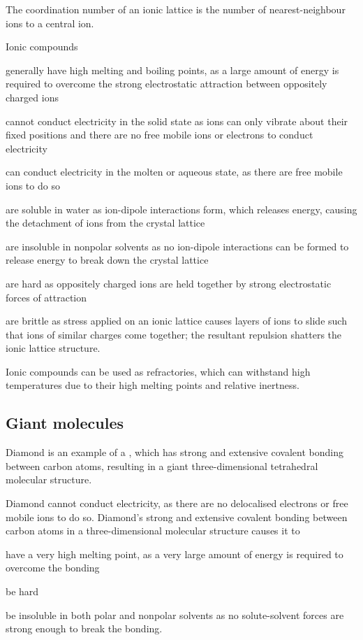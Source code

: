 \documentclass[Chemistry.tex]{subfiles}
\begin{document}
The coordination number of an ionic lattice is the number of nearest-neighbour ions to a central ion.

Ionic compounds \begin{slinenum}
\item generally have high melting and boiling points, as a large amount of energy is required to overcome the strong electrostatic attraction between oppositely charged ions
\item cannot conduct electricity in the solid state as ions can only vibrate about their fixed positions and there are no free mobile ions or electrons to conduct electricity
\item can conduct electricity in the molten or aqueous state, as there are free mobile ions to do so
\item are soluble in water as ion-dipole interactions form, which releases energy, causing the detachment of ions from the crystal lattice
\item are insoluble in nonpolar solvents as no ion-dipole interactions can be formed to release energy to break down the crystal lattice
\item are hard as oppositely charged ions are held together by strong electrostatic forces of attraction
\item are brittle as stress applied on an ionic lattice causes layers of ions to slide such that ions of similar charges come together; the resultant repulsion shatters the ionic lattice structure.\end{slinenum}

Ionic compounds can be used as refractories, which can withstand high temperatures due to their high melting points and relative inertness.
\subsection{Giant molecules}
Diamond is an example of a , which has strong and extensive covalent bonding between carbon atoms, resulting in a giant three-dimensional tetrahedral molecular structure.

Diamond cannot conduct electricity, as there are no delocalised electrons or free mobile ions to do so. Diamond's strong and extensive covalent bonding between carbon atoms in a three-dimensional molecular structure causes it to \begin{slinenum}
\item have a very high melting point, as a very large amount of energy is required to overcome the bonding
\item be hard
\item be insoluble in both polar and nonpolar solvents as no solute-solvent forces are strong enough to break the bonding.\end{slinenum}
\end{document}
